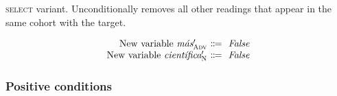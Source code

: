  \textsc{select} variant. Unconditionally removes all other readings that appear in the same cohort with the target.

\begin{equation}
\begin{array}{r @{~\eqdef~} l}
    \text{New variable } \mas{}'_\adv      & \text{ \em False} \\
    \text{New variable } \cientifica{}'_\n & \text{ \em False} \\
\end{array}
\label{eq:slAdjOrdered}
\end{equation}



\subsubsection{Positive conditions}

\def\invConds{\text{invalid condition}}
\def\onlyTrgLeft{\text{only target left}}

